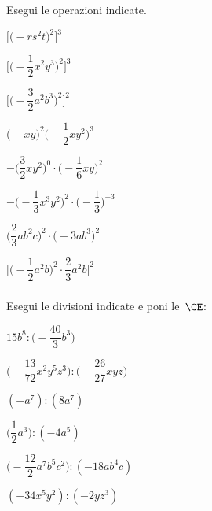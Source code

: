 \begin{esercizio}
 \label{ese:9.19}
 Esegui le operazioni indicate.
\begin{multicols}{2}
\begin{enumeratea}
\spazielenx
 \item \(\bigg[\big(-rs^{2}t\big)^{2}\bigg]^{3}\)
 \item \(\Bigg[\bigg(-{\dfrac{1}{2}}x^{2}y^{3}\bigg)^{2}\Bigg]^{3}\)
 \item \(\Bigg[\bigg(-{\dfrac{3}{2}}a^{2}b^{3}\bigg)^{2}\Bigg]^{2}\)
 \item \(\big(-xy\big)^{2}\bigg(-{\dfrac{1}{2}}xy^{2}\bigg)^{3}\)
 \item 
\(-\bigg(\dfrac{3}{2}xy^{2}\bigg)^{0}\cdot\bigg(-{\dfrac{1}{6}}xy\bigg)^{2}\)
 \item 
\(-\bigg(-{\dfrac{1}{3}}x^{3}y^{2}\bigg)^{2}\cdot
\bigg(-{\dfrac{1}{3}}\bigg)^{-3}\)
 \item \(\bigg(\dfrac{2}{3}ab^{2}c\bigg)^{2}\cdot\big(-3ab^{3}\big)^{2}\)
 \item 
\(\Bigg[\bigg(-{\dfrac{1}{2}}a^{2}b\bigg)^{2}\cdot{\dfrac{2}{3}a^{2}b}\Bigg]^{2}\)
\end{enumeratea}
\end{multicols}
\end{esercizio}

\subsubsection*{}

\begin{esercizio}
 \label{ese:9.21}
Esegui le divisioni indicate e poni le~\(\CE\):
\begin{multicols}{2}
\begin{enumeratea}
\spazielenx
 \item \(15b^{8}:\bigg(-{\dfrac{40}{3}}b^{3}\bigg)\)
 \item 
\(\bigg(-{\dfrac{13}{72}}x^{2}y^{5}z^{3}\bigg):\bigg(-{\dfrac{26}{27}}xyz\bigg)\)
 \item \((-a^{7}):(8a^{7})\)
 \item \(\bigg(\dfrac{1}{2}a^{3}\bigg):(-4a^{5})\)
 \item \(\bigg(-{\dfrac{12}{2}}a^{7}b^{5}c^{2}\bigg):(-18ab^{4}c)\)
 \item \((-34x^{5}y^{2}):(-2yz^{3})\)
\end{enumeratea}
\end{multicols}
\end{esercizio}

